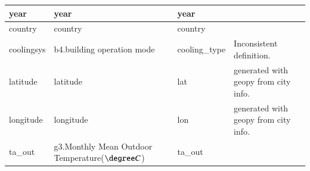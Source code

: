 \documentclass[1p]{elsarticle}
\begin{document}
\begin{table}[h!]
{\begin{tabular}{|l|l|l|l|}
      year                         & year                           & year                & \\ \hline
      country                      & country                        & country             & \\ \hline
      coolingsys                   & b4.building operation mode     & cooling\_type       & Inconsistent definition. \\ \hline
      latitude                     & latitude                       & lat                 & generated with geopy from city info.\\ \hline
      longitude                    & longitude                      & lon                 & generated with geopy from city info. \\ \hline
      ta\_out & g3.Monthly Mean Outdoor Temperature($\degree C$)    & ta\_out             & \\ \hline
    \end{tabular}%
}
  \label{tab:comparison}
\end{table}
\end{document}
